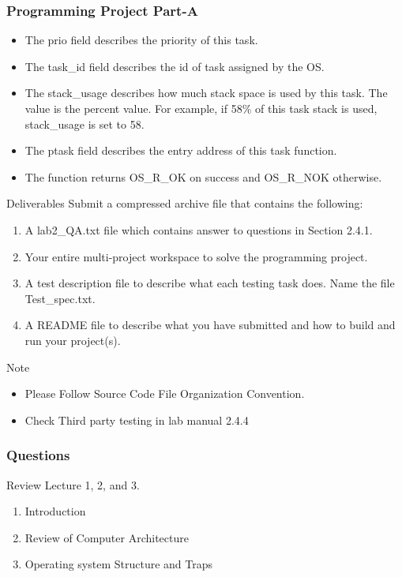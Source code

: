 \documentclass[serif,mathserif]{beamer}
\begin{document}
\begin{frame}
\frametitle{Programming Project Part-A}

\begin{itemize}
\item The prio field describes the priority of this task.
\item The task\_id field describes the id of task assigned by the OS.
\item  The stack\_usage describes how much stack space is used by this task. The value is
the percent value. For example, if 58\% of this task stack is used, stack\_usage is set
to 58.
\item The ptask field describes the entry address of this task function.
 \item The function returns OS\_R\_OK on success and OS\_R\_NOK otherwise.
\end{itemize}
\end{frame}

\begin{frame} {Deliverables}
Submit a compressed archive file that contains the following:
\begin{enumerate}
\item A lab2\_QA.txt file which contains answer to questions in Section 2.4.1.
\item Your entire multi-project workspace to solve the programming project.
\item A test description file to describe what each testing task does. Name the file Test\_spec.txt.
\item A README file to describe what you have submitted and how to build and run your
project(s).
\end{enumerate}
  
\end{frame}

\begin{frame} {Note}
\begin{itemize}
\item  Please Follow Source Code File Organization Convention.
\item Check Third party testing in lab manual 2.4.4
\end{itemize}
  
\end{frame}







\begin{frame}
  \frametitle{Questions}
  
  Review Lecture 1, 2, and 3.
  \begin{enumerate}
  \item Introduction
  \item Review of Computer Architecture 
  \item Operating system Structure and Traps
  \end{enumerate}
\end{frame}
\end{document}
